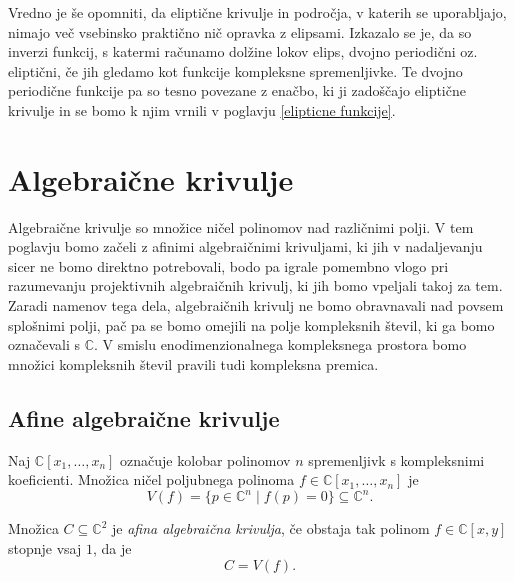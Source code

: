 \documentclass[mat1]{fmfdelo}
\newcommand{\C}{\mathbb C}
\theoremstyle{definition}
\begin{document}
Vredno je še opomniti, da eliptične krivulje in področja, v katerih se uporabljajo,
nimajo več vsebinsko praktično nič opravka z elipsami. 
Izkazalo se je, da so inverzi funkcij, s katermi računamo dolžine lokov elips, dvojno periodični oz. eliptični,
če jih gledamo kot funkcije kompleksne spremenljivke. Te dvojno periodične funkcije pa so tesno povezane z enačbo,
ki ji zadoščajo eliptične krivulje in se bomo k njim vrnili v poglavju \ref{elipticne funkcije}.


\section{Algebraične krivulje} \label{algebraicne krivulje}
Algebraične krivulje so množice ničel polinomov nad različnimi polji. V tem poglavju bomo začeli 
z afinimi
algebraičnimi krivuljami, ki jih v nadaljevanju sicer ne bomo direktno potrebovali, bodo pa igrale pomembno
vlogo pri razumevanju projektivnih algebraičnih krivulj, ki jih bomo vpeljali takoj za tem. 
Zaradi namenov tega dela, algebraičnih krivulj ne bomo obravnavali nad povsem splošnimi polji, pač pa se
bomo omejili na polje kompleksnih števil, ki ga bomo označevali s $\C$. V smislu enodimenzionalnega kompleksnega prostora bomo množici kompleksnih števil pravili tudi kompleksna premica.


\subsection{Afine algebraične krivulje} 
Naj $\C[x_1, \dots, x_n]$ označuje kolobar polinomov $n$ spremenljivk s
kompleksnimi koeficienti. Množica ničel poljubnega polinoma $f \in \C[x_1, \dots, x_n]$ je
\[
    V(f) = \{p \in \C^n \mid f(p) = 0 \} \subseteq \C^n.
\] 

\begin{definicija}
    Množica $C \subseteq \C^2$ je \emph{afina algebraična krivulja}, če obstaja tak polinom $f \in \C[x,y]$ stopnje vsaj $1$, da je
    \[
        C = V(f).
    \]
\end{definicija}
\end{document}
